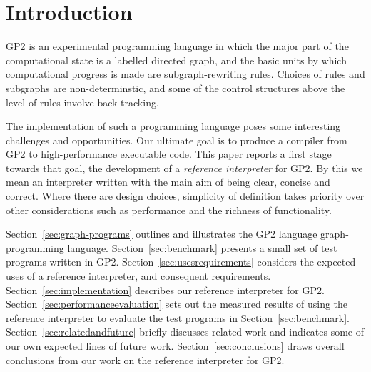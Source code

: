 \section{Introduction}

GP2 is an experimental programming language in which the major part of
the computational state is a labelled directed graph, and the basic
units by which computational progress is made are subgraph-rewriting
rules.
Choices of rules and subgraphs are non-determinstic, and some of
the control structures above the level of rules involve back-tracking.

The implementation of such a programming language poses some
interesting challenges and opportunities.
Our ultimate goal is to produce a compiler from GP2 to
high-performance executable code.
This paper reports a first stage towards that goal, the development
of a \emph{reference interpreter} for GP2.
By this we mean an interpreter written with the main aim of
being clear, concise and correct.
Where there are design choices, simplicity of
definition takes priority over other considerations
such as performance and the richness of functionality.

Section~\ref{sec:graph-programs} outlines and illustrates the GP2 language
graph-programming language.
Section~\ref{sec:benchmark} presents a small set of test programs
written in GP2.
Section~\ref{sec:usesrequirements} considers the expected uses of
a reference interpreter, and consequent requirements.
Section~\ref{sec:implementation} describes our reference interpreter for
GP2.
Section~\ref{sec:performanceevaluation} sets out the measured results of using the reference
interpreter to evaluate the test programs in Section~\ref{sec:benchmark}.
Section~\ref{sec:relatedandfuture} briefly discusses related work and
indicates some of our own expected lines of future work.
Section~\ref{sec:conclusions} draws overall conclusions from our work
on the reference interpreter for GP2.

